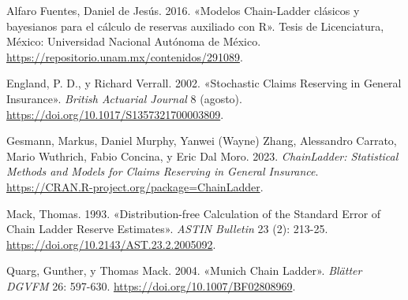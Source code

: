 \documentclass[
  12pt,
]{article}
\newlength{\cslhangindent}
\newenvironment{CSLReferences}[2] %
 {\begin{list}{}{%
  \setlength{\itemindent}{0pt}
  \setlength{\leftmargin}{0pt}
  \setlength{\parsep}{0pt}
  \ifodd #1
   \setlength{\leftmargin}{\cslhangindent}
   \setlength{\itemindent}{-1\cslhangindent}
  \fi
  \setlength{\itemsep}{#2\baselineskip}}}
 {\end{list}}
\begin{document}
\label{refs}
\begin{CSLReferences}{1}{0}
Alfaro Fuentes, Daniel de Jesús. 2016. {«Modelos Chain-Ladder clásicos y
bayesianos para el cálculo de reservas auxiliado con R»}. Tesis de
Licenciatura, México: Universidad Nacional Autónoma de México.
\url{https://repositorio.unam.mx/contenidos/291089}.

England, P. D., y Richard Verrall. 2002. {«Stochastic Claims Reserving
in General Insurance»}. \emph{British Actuarial Journal} 8 (agosto).
\url{https://doi.org/10.1017/S1357321700003809}.

Gesmann, Markus, Daniel Murphy, Yanwei (Wayne) Zhang, Alessandro
Carrato, Mario Wuthrich, Fabio Concina, y Eric Dal Moro. 2023.
\emph{ChainLadder: Statistical Methods and Models for Claims Reserving
in General Insurance}.
\url{https://CRAN.R-project.org/package=ChainLadder}.

Mack, Thomas. 1993. {«Distribution-free Calculation of the Standard
Error of Chain Ladder Reserve Estimates»}. \emph{ASTIN Bulletin} 23 (2):
213-25. \url{https://doi.org/10.2143/AST.23.2.2005092}.

Quarg, Gunther, y Thomas Mack. 2004. {«Munich Chain Ladder»}.
\emph{Bl{ä}tter DGVFM} 26: 597-630.
\url{https://doi.org/10.1007/BF02808969}.

\end{CSLReferences}
\end{document}
